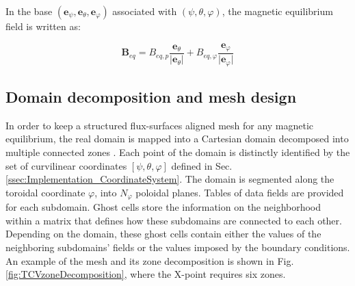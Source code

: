 In the base $(\boldsymbol{e}_{\psi}, \boldsymbol{e}_{\theta}, \boldsymbol{e}_{\varphi})$ associated with $(\psi, \theta, \varphi)$, the magnetic equilibrium field is written as:

\begin{equation}
	\boldsymbol{B}_{eq} = B_{eq,p} \frac{\boldsymbol{e}_{\theta}}{\vert \boldsymbol{e}_{\theta} \vert} + B_{eq,\varphi} \frac{\boldsymbol{e}_{\varphi}}{\vert \boldsymbol{e}_{\varphi} \vert}
\end{equation}



\subsection{Domain decomposition and mesh design}
\label{ssec:impl_meshDecomposition}
In order to keep a structured flux-surfaces aligned mesh for any magnetic equilibrium, the real domain is mapped into a Cartesian domain decomposed into multiple connected zones \cite{tamain2016tokam3x}. Each point of the domain is distinctly identified by the set of curvilinear coordinates $[\psi, \theta, \varphi]$ defined in Sec. \ref{ssec:Implementation_CoordinateSystem}. The domain is segmented along the toroidal coordinate $\varphi$, into $N_{\varphi}$ poloidal planes. Tables of data fields are provided for each subdomain. Ghost cells store the information on the neighborhood within a matrix that defines how these subdomains are connected to each other. Depending on the domain, these ghost cells contain either the values of the neighboring subdomains' fields or the values imposed by the boundary conditions. An example of the mesh and its zone decomposition is shown in Fig. \ref{fig:TCVzoneDecomposition}, where the X-point requires six zones. \newline

